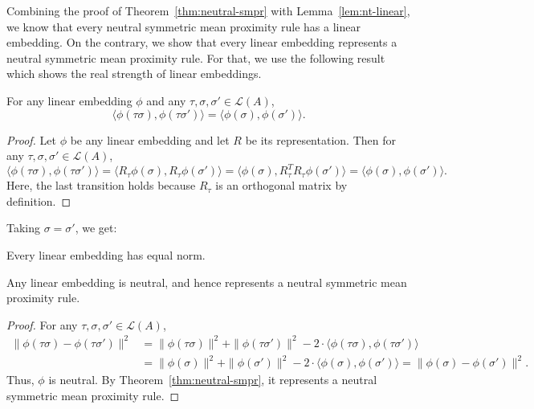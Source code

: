 \documentclass[prodmode,acmec]{ec-acmsmall}
\newcommand{\calL}{{\mathcal{L}}}
\newcommand{\rank}{{\calL(A)}}
\begin{document}
Combining the proof of Theorem~\ref{thm:neutral-smpr} with Lemma~\ref{lem:nt-linear}, we know that every neutral symmetric mean proximity rule has a linear embedding. On the contrary, we show that every linear embedding represents a neutral symmetric mean proximity rule. For that, we use the following result which shows the real strength of linear embeddings.
\begin{lemma}
For any linear embedding $\phi$ and any $\tau,\sigma,\sigma' \in \rank$, 
$$
\langle \phi(\tau \sigma), \phi(\tau \sigma') \rangle = \langle \phi(\sigma), \phi(\sigma') \rangle.
$$
\label{lem:inner-product-preserve}
\end{lemma}
\begin{proof}
Let $\phi$ be any linear embedding and let $R$ be its representation. Then for any $\tau,\sigma,\sigma' \in \rank$,
\begin{equation}
\langle \phi(\tau \sigma), \phi(\tau \sigma') \rangle = \langle R_{\tau}\phi(\sigma), R_{\tau}\phi(\sigma') \rangle = \langle \phi(\sigma), R_{\tau}^T R_{\tau}\phi(\sigma') \rangle = \langle \phi(\sigma), \phi(\sigma') \rangle.
\label{eqn:linear-inner-product}
\end{equation}
Here, the last transition holds because $R_{\tau}$ is an orthogonal matrix by definition. 
\end{proof}
Taking $\sigma = \sigma'$, we get:
\begin{corollary}
Every linear embedding has equal norm.
\label{cor:linear-equal-norm}
\end{corollary}

\begin{lemma}
Any linear embedding is neutral, and hence represents a neutral symmetric mean proximity rule.
\label{lem:linear-neutral}
\end{lemma}
\begin{proof}
For any $\tau,\sigma,\sigma' \in \rank$,
\begin{align*}
\|\phi(\tau \sigma)-\phi(\tau \sigma')\|^2 &= \|\phi(\tau \sigma)\|^2 + \|\phi(\tau \sigma')\|^2 - 2\cdot \langle \phi(\tau \sigma), \phi(\tau \sigma') \rangle \\
&= \|\phi(\sigma)\|^2 + \|\phi(\sigma')\|^2 - 2\cdot \langle \phi(\sigma), \phi(\sigma') \rangle = \|\phi(\sigma)-\phi(\sigma')\|^2.
\end{align*}
Thus, $\phi$ is neutral. By Theorem~\ref{thm:neutral-smpr}, it represents a neutral symmetric mean proximity rule.
\end{proof}
\end{document}
